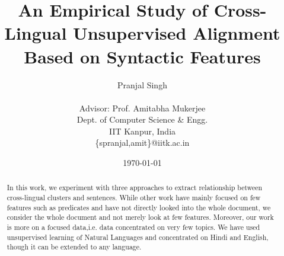\documentclass{article}
\title{\huge{An Empirical Study of Cross-Lingual Unsupervised Alignment Based on Syntactic Features}}
\author{Pranjal Singh \\ \\  Advisor: Prof. Amitabha Mukerjee \\ Dept. of Computer Science \& Engg.\\ IIT Kanpur, India \\ \{spranjal,amit\}@iitk.ac.in}
\date{\today}
\begin{document}
\maketitle
\begin{abstract}
In this work, we experiment with three approaches to extract relationship between cross-lingual clusters and sentences. While other work have mainly focused on few features such as predicates and have not directly looked into the whole document, we consider the whole document and not merely look at few features. Moreover, our work is more on a focused data,i.e. data concentrated on very few topics. We have used unsupervised learning of Natural Languages and concentrated on Hindi and English, though it can be extended to any language.
\end{abstract}\setlength{\parindent}{0.25in}
\end{document}
